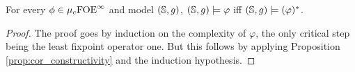 \begin{theorem}\label{thm:guard_wmso}
For every $\phi \in \mu_{c}{\mathrm{FOE}}^\infty$ and model $(\mathbb{S},g)$, $(\mathbb{S}, g) \models \varphi$ iff $(\mathbb{S}, g) \models (\varphi)^*$.
%
%
\end{theorem}
\begin{proof}
The proof goes by induction on the complexity of $\varphi$, the only critical step being the least fixpoint operator one. But this follows by applying Proposition \ref{prop:cor_constructivity} and the induction hypothesis.
%

\end{proof}
